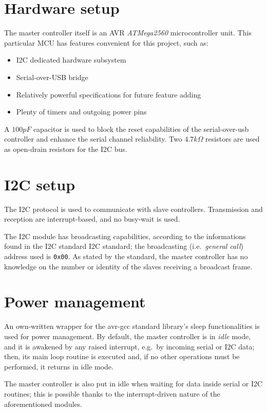 \documentclass[binding=0.6cm,Lau]{sapthesis}
\begin{document}
\section{Hardware setup}
The master controller itself is an AVR \emph{ATMega2560} microcontroller
unit\cite{at2560-ref}. This particular MCU has features convenient for this
project, such as:
\begin{itemize}
  \item I2C dedicated hardware subsystem
  \item Serial-over-USB bridge
  \item Relatively powerful specifications for future feature adding
  \item Plenty of timers and outgoing power pins
\end{itemize}

A $100 pF$ capacitor is used to block the reset capabilities of the
serial-over-usb controller and enhance the serial channel reliability. Two
$4.7 k\Omega$ resistors are used as open-drain resistors for the I2C bus.

\section{I2C setup}
The I2C protocol is used to communicate with slave controllers. Transmission
and reception are interrupt-based, and no busy-wait is used.

The I2C module has broadcasting capabilities, according to the informations
found in the I2C standard I2C standard\cite{i2c-ref}; the broadcasting (i.e.\
\emph{general call}) address used is \texttt{0x00}. As stated by the standard,
the master controller has no knowledge on the number or identity of the slaves
receiving a broadcast frame.

\section{Power management}
An own-written wrapper for the avr-gcc standard library's sleep functionalities
is used for power management.  By default, the master controller is in
\emph{idle} mode, and it is awakened by any raised interrupt, e.g.\ by incoming
serial or I2C data; then, its main loop routine is executed and, if no other
operations must be performed, it returns in idle mode.

The master controller is also put in idle when waiting for data inside serial
or I2C routines; this is possible thanks to the interrupt-driven nature of the
aforementioned modules.
\end{document}
